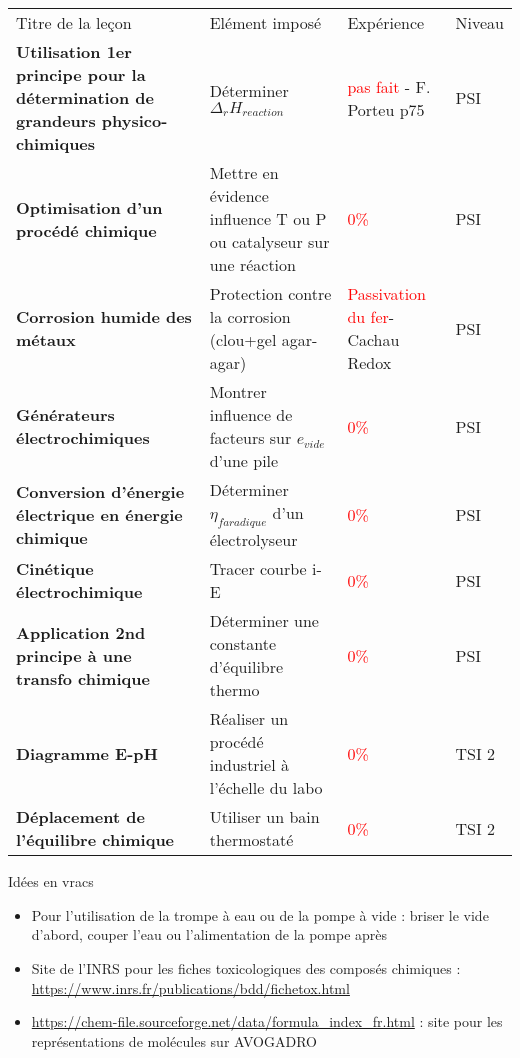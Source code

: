 \newpage
\begin{changemargin}{-1.5cm}{-0cm}
\begin{tabularx}{\paperwidth-2cm}{| X | X | X | X |}
  \hline
  \rowcolor{gray!20}\multicolumn{4}{c}{Avancement préparation oraux Leçons Chimie} \\
  \hline 
  Titre de la leçon & Elément imposé & Expérience & Niveau \\
  \hline
  \textbf{Utilisation 1er principe pour la détermination de grandeurs physico-chimiques} & Déterminer $\Delta_rH_{reaction}$ & \textcolor{red}{pas fait} - F. Porteu p75 & PSI \\
  \hline
  \textbf{Optimisation d'un procédé chimique} & Mettre en évidence influence T ou P ou catalyseur sur une réaction & \textcolor{red}{0\%} & PSI \\
  \hline
  \textbf{Corrosion humide des métaux} & Protection contre la corrosion (clou+gel agar-agar) & \textcolor{red}{Passivation du fer}-Cachau Redox & PSI \\
  \hline
  \textbf{Générateurs électrochimiques} & Montrer influence de facteurs sur $e_{vide}$ d'une pile & \textcolor{red}{0\%} & PSI \\
  \hline
  \textbf{Conversion d'énergie électrique en énergie chimique} & Déterminer $\eta_{faradique}$ d'un électrolyseur & \textcolor{red}{0\%} & PSI \\
  \hline
  \textbf{Cinétique électrochimique} & Tracer courbe i-E & \textcolor{red}{0\%} & PSI \\
  \hline
  \textbf{Application 2nd principe à une transfo chimique} & Déterminer une constante d'équilibre thermo & \textcolor{red}{0\%} & PSI \\
  \hline
  \hline
  \textbf{Diagramme E-pH} & Réaliser un procédé industriel à l'échelle du labo & \textcolor{red}{0\%} & TSI 2 \\
  \hline
  \textbf{Déplacement de l'équilibre chimique} & Utiliser un bain thermostaté & \textcolor{red}{0\%} & TSI 2 \\
  \hline  
\end{tabularx}

\end{changemargin}
\newpage
\begin{headerBlock}{\huge{Idées en vracs}}
\begin{itemize}
    \item Pour l'utilisation de la trompe à eau ou de la pompe à vide : briser le vide d'abord, couper l'eau ou l'alimentation de la pompe après
    \item Site de l'INRS pour les fiches toxicologiques des composés chimiques : \url{https://www.inrs.fr/publications/bdd/fichetox.html}
    \item \url{https://chem-file.sourceforge.net/data/formula_index_fr.html} : site pour les représentations de molécules sur AVOGADRO
\end{itemize}

\end{headerBlock}

